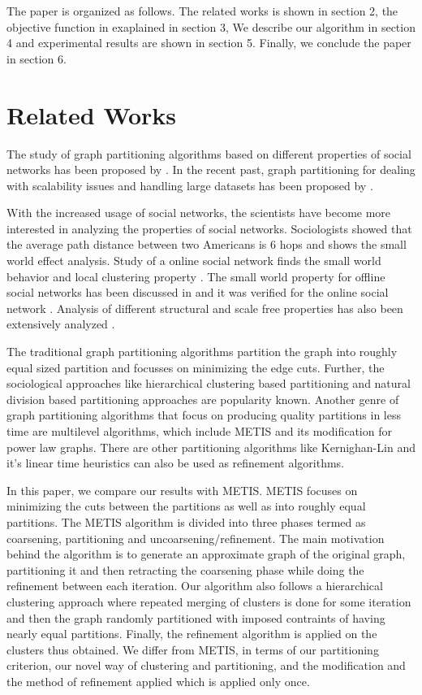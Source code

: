 \documentclass[letterpaper]{article}
\begin{document}
The paper is organized as follows. The related works is shown in section 2, the
objective function in exaplained in section 3, We describe our algorithm  in
section 4 and  experimental results are shown in section 5.  Finally, we
conclude the paper in section 6.

\section{Related Works}
  The study of graph partitioning algorithms based on different properties of
social networks has been proposed by \cite{arxviv}. In the recent past, graph
partitioning for dealing with scalability issues and handling large datasets
has been proposed by \cite{5,6}.

    With the increased usage of social networks, the scientists have become
more interested in analyzing the properties of social networks.  Sociologists
showed that the average path distance between two Americans is 6 hops \cite{4}
and \cite{8} shows the small world effect analysis.  Study of a online social
network  finds the small world behavior and local clustering property
\cite{9}.  The small world property for offline social networks has been
discussed in \cite{9,10,11} and it was verified for the online social network
\cite{12,13}. Analysis of different structural and scale free properties has
also been extensively analyzed \cite{12}.



    The traditional graph partitioning algorithms\cite{16,17,18} partition the
graph into roughly equal sized partition  and focusses on minimizing the edge
cuts.  Further, the sociological approaches like hierarchical clustering based
partitioning and natural division based partitioning approaches are popularity
known\cite{19}. Another genre of graph partitioning algorithms that focus on
producing quality partitions in less time are multilevel algorithms, which
include METIS\cite{20} and its modification for power law graphs\cite{21}.
There are other partitioning algorithms like Kernighan-Lin\cite{22} and it's
linear time heuristics\cite{23} can also be used as refinement algorithms.


    In this paper, we  compare our results with METIS\cite{20}. METIS focuses
on minimizing the cuts between the partitions as well as into roughly equal
partitions. The METIS algorithm is divided into three phases termed as
coarsening, partitioning and uncoarsening/refinement.  The main motivation
behind the algorithm is to generate an approximate graph of the original graph,
partitioning it and then retracting the coarsening phase while doing the
refinement between each iteration.  Our algorithm also follows a hierarchical
clustering approach where repeated merging of clusters is done for some
iteration and then the graph randomly partitioned with imposed contraints of
having nearly equal partitions. Finally, the refinement algorithm is applied on
the clusters thus obtained. We differ from METIS, in terms of our partitioning
criterion, our novel way of clustering and partitioning, and  the modification
and the method of refinement applied which is applied only once.
\end{document}
